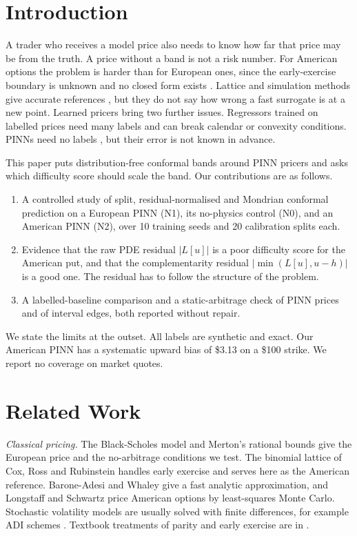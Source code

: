 \documentclass[conference]{IEEEtran}
\newcommand{\usd}{\$}
\begin{document}
\section{Introduction}
A trader who receives a model price also needs to know how far that price may be from the truth. A price without a band is not a risk number. For American options the problem is harder than for European ones, since the early-exercise boundary is unknown and no closed form exists \cite{merton1973theory,hull2022options}. Lattice and simulation methods give accurate references \cite{cox1979option,longstaff2001valuing}, but they do not say how wrong a fast surrogate is at a new point. Learned pricers bring two further issues. Regressors trained on labelled prices need many labels and can break calendar or convexity conditions. PINNs need no labels \cite{raissi2019physics}, but their error is not known in advance.

This paper puts distribution-free conformal bands \cite{vovk2005algorithmic,lei2018distribution} around PINN pricers and asks which difficulty score should scale the band. Our contributions are as follows.
\begin{enumerate}
\item A controlled study of split, residual-normalised and Mondrian conformal prediction on a European PINN (N1), its no-physics control (N0), and an American PINN (N2), over 10 training seeds and 20 calibration splits each.
\item Evidence that the raw PDE residual $|L[u]|$ is a poor difficulty score for the American put, and that the complementarity residual $|\min(L[u],u-h)|$ is a good one. The residual has to follow the structure of the problem.
\item A labelled-baseline comparison and a static-arbitrage check of PINN prices and of interval edges, both reported without repair.
\end{enumerate}
We state the limits at the outset. All labels are synthetic and exact. Our American PINN has a systematic upward bias of \usd 3.13 on a \usd 100 strike. We report no coverage on market quotes.

\section{Related Work}
\emph{Classical pricing.} The Black-Scholes model \cite{black1973pricing} and Merton's rational bounds \cite{merton1973theory} give the European price and the no-arbitrage conditions we test. The binomial lattice of Cox, Ross and Rubinstein \cite{cox1979option} handles early exercise and serves here as the American reference. Barone-Adesi and Whaley \cite{baroneadesi1987efficient} give a fast analytic approximation, and Longstaff and Schwartz \cite{longstaff2001valuing} price American options by least-squares Monte Carlo. Stochastic volatility models \cite{heston1993closed} are usually solved with finite differences, for example ADI schemes \cite{inthout2010adi}. Textbook treatments of parity and early exercise are in \cite{hull2022options}.
\end{document}
